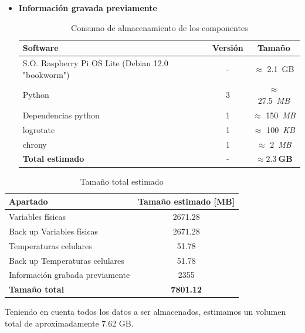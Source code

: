 \begin{itemize}
        \item \textbf{Información gravada previamente}

        \begin{table}[H]
        \centering
        \begin{tabular}{|l|c|c|}
        \hline
        \textbf{Software} & \textbf{Versión} & \textbf{Tamaño} \\
        \hline
        S.O. Raspberry Pi OS Lite (Debian 12.0 "bookworm") & - & $\approx$ 2.1~GB \\
        Python                   & 3 & $\approx$ 27.5~\textit{MB} \\
        Dependencias python      & 1 & $\approx$ 150~\textit{MB} \\
        logrotate                & 1 & $\approx$ 100~\textit{KB} \\
        chrony                   & 1 & $\approx$ 2~\textit{MB} \\
        \hline
        \textbf{Total estimado}  & - & $\boldsymbol{\approx 2.3~GB}$ \\
        \hline
        \end{tabular}
        \caption{Consumo de almacenamiento de los componentes}
        \label{tab:almacenamiento_componentes}
        \end{table}
    
      \end{itemize}

      \begin{table}[H]
      \centering
      \begin{tabular}{|l|c|}
      \hline
      \textbf{Apartado} & \textbf{Tamaño estimado [MB]} \\
      \hline
      Variables físicas              & 2671.28 \\
      Back up Variables físicas      & 2671.28 \\
      Temperaturas celulares         & 51.78  \\
      Back up Temperaturas celulares & 51.78  \\
      Información grabada previamente & 2355 \\
      \hline
      \textbf{Tamaño total}          & \textbf{7801.12} \\
      \hline
      \end{tabular}
      \caption{Tamaño total estimado}
      \label{tab:tamano_total_estimado}
      \end{table}

      Teniendo en cuenta todos los datos a ser almacenados, estimamos un volumen total de
      aproximadamente 7.62 GB.

